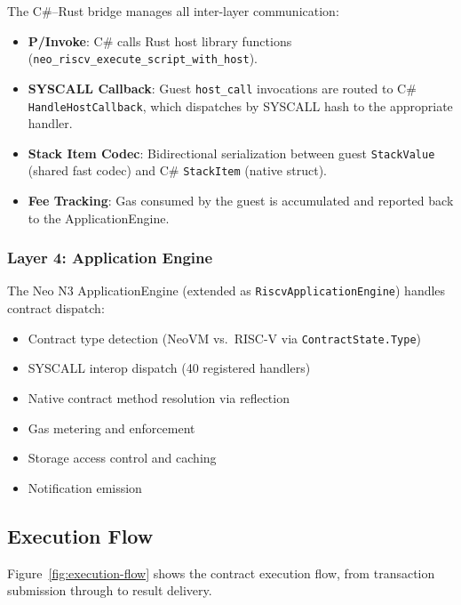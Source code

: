 \documentclass[11pt,a4paper]{article}
\begin{document}
The C\#--Rust bridge manages all inter-layer communication:

\begin{itemize}[noitemsep]
    \item \textbf{P/Invoke}: C\# calls Rust host library functions
          (\texttt{neo\_riscv\_execute\_script\_with\_host}).
    \item \textbf{SYSCALL Callback}: Guest \texttt{host\_call} invocations
          are routed to C\# \texttt{HandleHostCallback}, which dispatches
          by SYSCALL hash to the appropriate handler.
    \item \textbf{Stack Item Codec}: Bidirectional serialization between
          guest \texttt{StackValue} (shared fast codec) and C\# \texttt{StackItem}
          (native struct).
    \item \textbf{Fee Tracking}: Gas consumed by the guest is accumulated
          and reported back to the ApplicationEngine.
\end{itemize}

\subsubsection{Layer 4: Application Engine}

The Neo N3 ApplicationEngine (extended as \texttt{RiscvApplicationEngine})
handles contract dispatch:

\begin{itemize}[noitemsep]
    \item Contract type detection (NeoVM vs.\ RISC-V via \texttt{ContractState.Type})
    \item SYSCALL interop dispatch (40 registered handlers)
    \item Native contract method resolution via reflection
    \item Gas metering and enforcement
    \item Storage access control and caching
    \item Notification emission
\end{itemize}

\subsection{Execution Flow}

Figure~\ref{fig:execution-flow} shows the contract execution flow, from
transaction submission through to result delivery.
\end{document}
